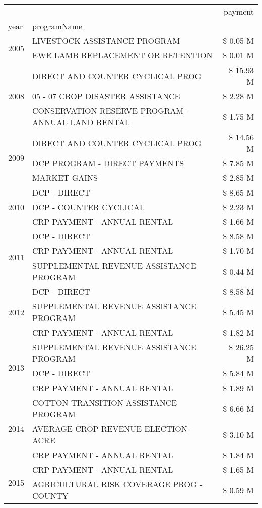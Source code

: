 \begin{tabular}{llr}
\toprule
 &  & payment \\
year & programName &  \\
\midrule
\multirow[t]{2}{*}{2005} & LIVESTOCK ASSISTANCE PROGRAM & \$ 0.05 M \\
 & EWE LAMB REPLACEMENT OR RETENTION & \$ 0.01 M \\
\cline{1-3}
\multirow[t]{3}{*}{2008} & DIRECT AND COUNTER CYCLICAL PROG & \$ 15.93 M \\
 & 05 - 07 CROP DISASTER ASSISTANCE & \$ 2.28 M \\
 & CONSERVATION RESERVE PROGRAM - ANNUAL LAND RENTAL & \$ 1.75 M \\
\cline{1-3}
\multirow[t]{3}{*}{2009} & DIRECT AND COUNTER CYCLICAL PROG & \$ 14.56 M \\
 & DCP PROGRAM - DIRECT PAYMENTS & \$ 7.85 M \\
 & MARKET GAINS & \$ 2.85 M \\
\cline{1-3}
\multirow[t]{3}{*}{2010} & DCP - DIRECT & \$ 8.65 M \\
 & DCP - COUNTER CYCLICAL & \$ 2.23 M \\
 & CRP PAYMENT - ANNUAL RENTAL & \$ 1.66 M \\
\cline{1-3}
\multirow[t]{3}{*}{2011} & DCP - DIRECT & \$ 8.58 M \\
 & CRP PAYMENT - ANNUAL RENTAL & \$ 1.70 M \\
 & SUPPLEMENTAL REVENUE ASSISTANCE PROGRAM & \$ 0.44 M \\
\cline{1-3}
\multirow[t]{3}{*}{2012} & DCP - DIRECT & \$ 8.58 M \\
 & SUPPLEMENTAL REVENUE ASSISTANCE PROGRAM & \$ 5.45 M \\
 & CRP PAYMENT - ANNUAL RENTAL & \$ 1.82 M \\
\cline{1-3}
\multirow[t]{3}{*}{2013} & SUPPLEMENTAL REVENUE ASSISTANCE PROGRAM & \$ 26.25 M \\
 & DCP - DIRECT & \$ 5.84 M \\
 & CRP PAYMENT - ANNUAL RENTAL & \$ 1.89 M \\
\cline{1-3}
\multirow[t]{3}{*}{2014} & COTTON TRANSITION ASSISTANCE PROGRAM & \$ 6.66 M \\
 & AVERAGE CROP REVENUE ELECTION-ACRE & \$ 3.10 M \\
 & CRP PAYMENT - ANNUAL RENTAL & \$ 1.84 M \\
\cline{1-3}
\multirow[t]{3}{*}{2015} & CRP PAYMENT - ANNUAL RENTAL & \$ 1.65 M \\
 & AGRICULTURAL RISK COVERAGE PROG - COUNTY & \$ 0.59 M \\

\end{tabular}
